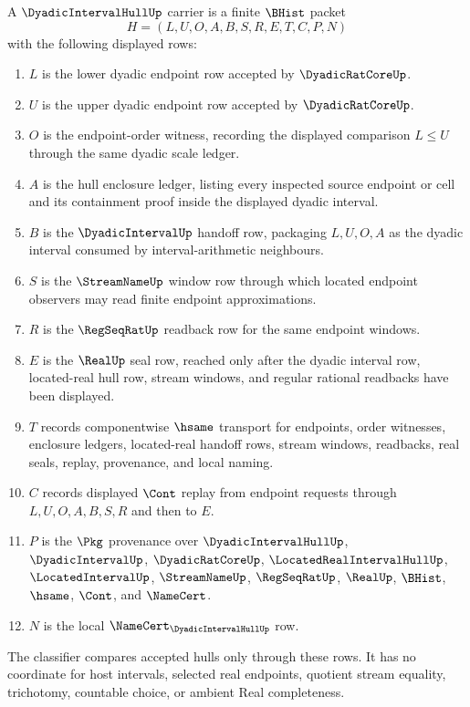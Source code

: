 \begin{definition}
\label{def:dyadic-interval-hull-carrier}
A $\DyadicIntervalHullUp$ carrier is a finite $\BHist$ packet
$$
H=(L,U,O,A,B,S,R,E,T,C,P,N)
$$
with the following displayed rows:
\begin{enumerate}
\item $L$ is the lower dyadic endpoint row accepted by $\DyadicRatCoreUp$.
\item $U$ is the upper dyadic endpoint row accepted by $\DyadicRatCoreUp$.
\item $O$ is the endpoint-order witness, recording the displayed comparison $L\leq U$ through the same dyadic scale ledger.
\item $A$ is the hull enclosure ledger, listing every inspected source endpoint or cell and its containment proof inside the displayed dyadic interval.
\item $B$ is the $\DyadicIntervalUp$ handoff row, packaging $L,U,O,A$ as the dyadic interval consumed by interval-arithmetic neighbours.
\item $S$ is the $\StreamNameUp$ window row through which located endpoint observers may read finite endpoint approximations.
\item $R$ is the $\RegSeqRatUp$ readback row for the same endpoint windows.
\item $E$ is the $\RealUp$ seal row, reached only after the dyadic interval row, located-real hull row, stream windows, and regular rational readbacks have been displayed.
\item $T$ records componentwise $\hsame$ transport for endpoints, order witnesses, enclosure ledgers, located-real handoff rows, stream windows, readbacks, real seals, replay, provenance, and local naming.
\item $C$ records displayed $\Cont$ replay from endpoint requests through $L,U,O,A,B,S,R$ and then to $E$.
\item $P$ is the $\Pkg$ provenance over $\DyadicIntervalHullUp$, $\DyadicIntervalUp$, $\DyadicRatCoreUp$, $\LocatedRealIntervalHullUp$, $\LocatedIntervalUp$, $\StreamNameUp$, $\RegSeqRatUp$, $\RealUp$, $\BHist$, $\hsame$, $\Cont$, and $\NameCert$.
\item $N$ is the local $\NameCert_{\DyadicIntervalHullUp}$ row.
\end{enumerate}
The classifier compares accepted hulls only through these rows. It has no coordinate for host intervals, selected real endpoints, quotient stream equality, trichotomy, countable choice, or ambient Real completeness.
\end{definition}

